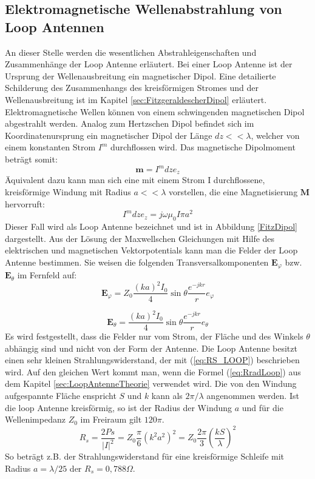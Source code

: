 \subsection{Elektromagnetische Wellenabstrahlung von Loop Antennen}
An dieser Stelle werden die wesentlichen Abstrahleigenschaften und Zusammenhänge der Loop Antenne erläutert.
Bei einer Loop Antenne ist der Ursprung der Wellenausbreitung ein magnetischer Dipol. Eine detailierte Schilderung des Zusammenhangs des kreisförmigen Stromes und der Wellenausbreitung ist im Kapitel \ref{sec:FitzgeraldescherDipol} erläutert. \\
Elektromagnetische Wellen können von einem schwingenden magnetischen Dipol
abgestrahlt werden. Analog zum Hertzschen Dipol befindet sich im Koordinatenursprung
ein magnetischer Dipol der Länge $dz<<\lambda$, welcher von einem konstanten
Strom $I^{m}$ durchflossen wird. Das magnetische Dipolmoment beträgt somit:
\begin{equation}
\textbf{m}=I^{m}dze_z
\end{equation}
Äquivalent dazu kann man sich eine mit einem Strom I durchflossene, kreisförmige Windung mit Radius $a<<\lambda$ vorstellen, die eine Magnetisierung $\textbf{M}$ hervorruft:
\begin{equation}
I^{m}dze_{z}=j\omega\mu_{0}I\pi a^{2}
\end{equation}
Dieser Fall wird als Loop Antenne bezeichnet und ist in Abbildung \ref{FitzDipol} dargestellt. Aus der Lösung der Maxwellschen Gleichungen mit Hilfe des elektrischen und
magnetischen Vektorpotentials kann man die Felder der Loop Antenne bestimmen.
Sie weisen die folgenden Transversalkomponenten $\textbf{E}_{\varphi}$ bzw. $\textbf{E}_{\theta}$ im Fernfeld auf:
\begin{equation}
\textbf{E}_{\varphi}=Z_{0}\dfrac{(ka)^2I_{0}}{4}\sin \theta \dfrac{e^{-jkr}}{r} e_{\varphi}
\end{equation}

\begin{equation}
\textbf{E}_{\theta}=\dfrac{(ka)^2I_{0}}{4}\sin \theta \dfrac{e^{-jkr}}{r} e_{\theta}
\end{equation}
Es wird festgestellt, dass die Felder nur vom Strom, der Fläche und des Winkels $\theta$ abhängig sind
und nicht von der Form der Antenne. 
Die Loop Antenne besitzt einen sehr kleinen Strahlungswiderstand, der mit (\ref{eq:RS_LOOP}) beschrieben wird. Auf den gleichen Wert kommt man, wenn die Formel (\ref{eq:RradLoop}) aus dem Kapitel \ref{sec:LoopAntenneTheorie} verwendet wird. Die von den Windung aufgespannte Fläche enspricht $S$ und $k$ kann als $2\pi/\lambda$ angenommen werden. Ist die loop Antenne kreisförmig, so ist der Radius der Windung $a$ und für die Wellenimpedanz $Z_0$ im Freiraum gilt $120\pi$.
\begin{equation}\label{eq:RS_LOOP}
R_{s}=\dfrac{2Ps}{|I|^{2}}=Z_{0}\dfrac{\pi}{6}(k^{2}a^{2})^{2}=Z_{0}\dfrac{2\pi}{3}\left(\dfrac{kS}{\lambda}\right)^{2} 
\end{equation}
So beträgt z.B. der Strahlungswiderstand für eine kreisförmige Schleife mit Radius $a = \lambda/25$ der $R_{s} = 0,788\Omega$.


